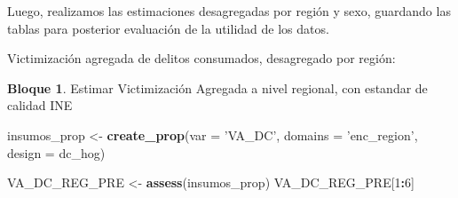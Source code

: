 \documentclass[]{book}
\newenvironment{Shaded}{\begin{snugshade}}{\end{snugshade}}
\newcommand{\DataTypeTok}[1]{\textcolor[rgb]{0.13,0.29,0.53}{#1}}
\newcommand{\DecValTok}[1]{\textcolor[rgb]{0.00,0.00,0.81}{#1}}
\newcommand{\KeywordTok}[1]{\textcolor[rgb]{0.13,0.29,0.53}{\textbf{#1}}}
\newcommand{\NormalTok}[1]{#1}
\newcommand{\OperatorTok}[1]{\textcolor[rgb]{0.81,0.36,0.00}{\textbf{#1}}}
\newcommand{\StringTok}[1]{\textcolor[rgb]{0.31,0.60,0.02}{#1}}
\theoremstyle{definition}
\theoremstyle{definition}
\newtheorem{example}{Bloque}[chapter]
\theoremstyle{definition}
\theoremstyle{definition}
\theoremstyle{remark}
\begin{document}
\begin{Shaded}
\end{Shaded}

Luego, realizamos las estimaciones desagregadas por región y sexo, guardando las tablas para posterior evaluación de la utilidad de los datos.

Victimización agregada de delitos consumados, desagregado por región:

\begin{example}
\protect\hypertarget{exm:bloque10nbm}{}{\label{exm:bloque10nbm} }Estimar Victimización Agregada a nivel regional, con estandar de calidad INE
\end{example}

\begin{Shaded}
\begin{Highlighting}[]
\NormalTok{insumos_prop <-}\StringTok{ }\KeywordTok{create_prop}\NormalTok{(}\DataTypeTok{var =} \StringTok{'VA_DC'}\NormalTok{, }
                                   \DataTypeTok{domains =} \StringTok{'enc_region'}\NormalTok{, }
                                   \DataTypeTok{design =}\NormalTok{  dc_hog)}

\NormalTok{VA_DC_REG_PRE <-}\StringTok{ }\KeywordTok{assess}\NormalTok{(insumos_prop)}
\NormalTok{VA_DC_REG_PRE[}\DecValTok{1}\OperatorTok{:}\DecValTok{6}\NormalTok{]}
\end{Highlighting}
\end{Shaded}
\end{document}
